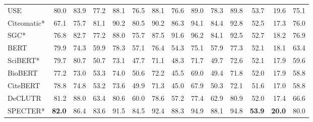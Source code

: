 \documentclass[11pt]{article}
\begin{document}
\begin{table*}[ht!]
\begin{tabular}{@{}lrrrrrrrrrrrrr@{}}
 USE \citeyearpar{Cer2018UniversalSE} &               80.0 &                83.9 &                    77.2 &                     88.1 &                    76.5 &                     88.1 &                 76.6 &                  89.0 &                    78.3 &                     89.8 &                        53.7 &                       19.6 &           75.1 \\
Citeomatic* \citeyearpar{Bhagavatula2018}           & 67.1 & 75.7 & 81.1 & 90.2 & 80.5 & 90.2 & 86.3 & 94.1 & 84.4 & 92.8 & 52.5 & 17.3 & 76.0 \\ 
SGC* \citeyearpar{Wu2019}               & 76.8 & 82.7 & 77.2 & 88.0 & 75.7 & 87.5 & 91.6 & 96.2 & 84.1 & 92.5 & 52.7 & 18.2 & 76.9 \\
BERT \citeyearpar{Devlin2019}  &               79.9 &                74.3 &                    59.9 &                     78.3 &                    57.1 &                     76.4 &                 54.3 &                  75.1 &                    57.9 &                     77.3 &                        52.1 &                       18.1 &           63.4 \\
SciBERT* \citeyearpar{Beltagy2019} & 79.7 & 80.7 & 50.7 & 73.1 & 47.7 & 71.1 & 48.3 & 71.7 & 49.7 & 72.6 & 52.1 & 17.9 & 59.6 \\ 
BioBERT \citeyearpar{Lee2019} &               77.2 &                73.0 &                    53.3 &                     74.0 &                    50.6 &                     72.2 &                 45.5 &                  69.0 &                    49.4 &                     71.8 &                        52.0 &                       17.9 &           58.8 \\
CiteBERT \citeyearpar{wright2021citeworth} &             78.8 &                74.8 &                    53.2 &                     73.6 &                    49.9 &                     71.3 &                 45.0 &                  67.9 &                    50.3 &                     72.1 &                        51.6 &                       17.0 &           58.8 \\
DeCLUTR \citeyearpar{Giorgi2021} &               81.2 &                88.0 &                    63.4 &                     80.6 &                    60.0 &                     78.6 &                 57.2 &                  77.4 &                    62.9 &                     80.9 &                        52.0 &                       17.4 &           66.6 \\

SPECTER* \citeyearpar{Cohan2020}         &  \bf{82.0} &	86.4 & 83.6 & 91.5 & 84.5 & 92.4 & 88.3 &	94.9 & 88.1 & 94.8 & \textbf{53.9}& \bf{20.0} &  80.0 \\ 



\end{tabular}
\end{table*}
\end{document}
